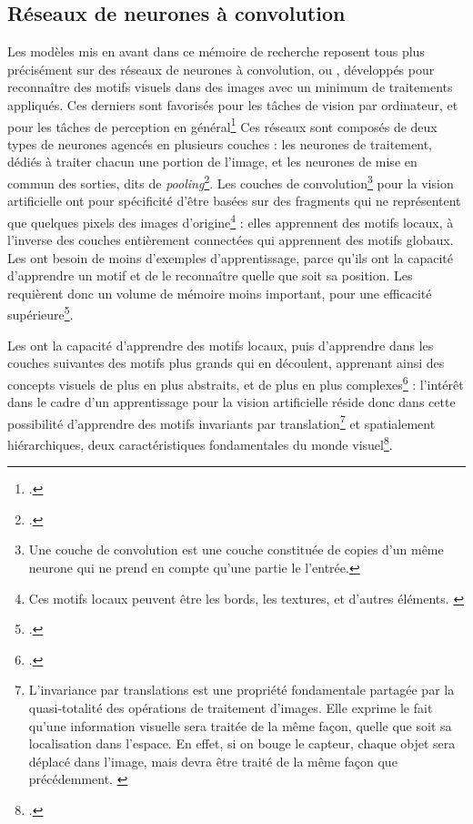 \subsection{Réseaux de neurones à convolution}
Les modèles mis en avant dans ce mémoire de recherche reposent tous plus précisément sur des réseaux de neurones à convolution, ou \cnn, développés pour reconnaître des motifs visuels dans des images avec un minimum de traitements appliqués. Ces derniers sont favorisés pour les tâches de vision par ordinateur, et pour les tâches de perception en général\footcite{cholletApprentissageProfondAvec2020a} Ces réseaux sont composés de deux types de neurones agencés en plusieurs couches : les neurones de traitement, dédiés à traiter chacun une portion de l'image, et les neurones de mise en commun des sorties, dits de \textit{pooling}\footcite{goodfellowDeepLearning2016}. Les couches de convolution\footnote{Une couche de convolution est une couche constituée de copies d'un même neurone qui ne prend en compte qu'une partie le l'entrée.} pour la vision artificielle ont pour spécificité d'être basées sur des fragments qui ne représentent que quelques pixels des images d'origine\footnote{Ces motifs locaux peuvent être les bords, les textures, et d'autres éléments. \cite{cholletApprentissageProfondAvec2020a}} : elles apprennent des motifs locaux, à l'inverse des couches entièrement connectées qui apprennent des motifs globaux. Les \cnn ont besoin de moins d'exemples d'apprentissage, parce qu'ils ont la capacité d'apprendre un motif et de le reconnaître quelle que soit sa position. Les \cnn requièrent donc un volume de mémoire moins important, pour une efficacité supérieure\footcite{goodfellowDeepLearning2016}. 
    
Les \cnn ont la capacité d'apprendre des motifs locaux, puis d'apprendre dans les couches suivantes des motifs plus grands qui en découlent, apprenant ainsi des concepts visuels de plus en plus abstraits, et de plus en plus complexes\footcite{cholletApprentissageProfondAvec2020a} : l'intérêt dans le cadre d'un apprentissage pour la vision artificielle réside donc dans cette possibilité d'apprendre des motifs invariants par translation\footnote{\og  L'invariance par translations est une propriété fondamentale partagée par la quasi-totalité des opérations de traitement d'images. Elle exprime le fait qu'une information visuelle sera traitée de la même façon, quelle que soit sa localisation dans l'espace. En effet, si on bouge le capteur, chaque objet sera déplacé dans l'image, mais devra être traité de la même façon que précédemment. \fg \cite{ronseInvarianceParTranslations}} et spatialement hiérarchiques, deux caractéristiques fondamentales du monde visuel\footcite{cholletApprentissageProfondAvec2020a}.

